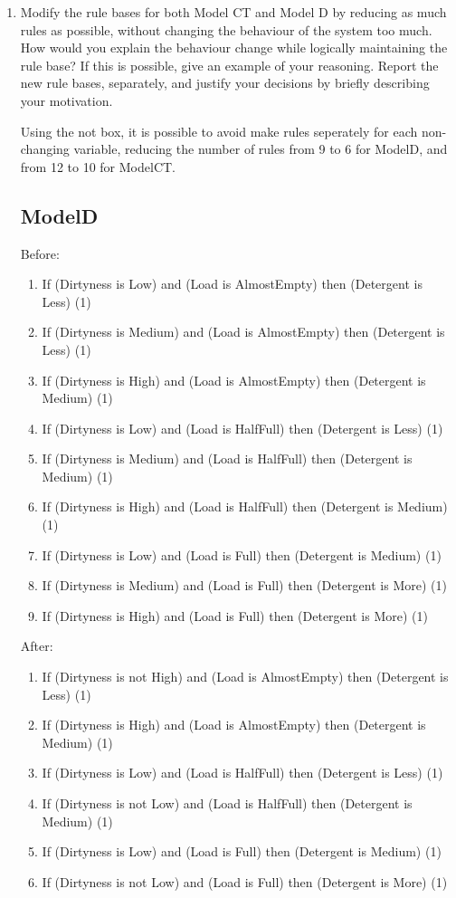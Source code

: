\documentclass[11pt]{article}
\begin{document}
\begin{enumerate}[label=(\alph*)]
  \item Modify the rule bases for both Model CT and Model D by reducing as much
  rules as possible, without changing the behaviour of the system too much. How
  would you explain the behaviour change while logically maintaining the rule
  base? If this is possible, give an example of your reasoning. Report the new
  rule bases, separately, and justify your decisions by brieﬂy describing your
  motivation.

  Using the not box, it is possible to avoid make rules seperately for each
  non-changing variable, reducing the number of rules from 9 to 6 for ModelD, and from 12 to 10 for ModelCT.

  \subsection*{ModelD}

  Before:
  \begin{enumerate}[label=(\arabic*)]
  \item If (Dirtyness is Low) and (Load is AlmostEmpty) then (Detergent is Less) (1)
  \item If (Dirtyness is Medium) and (Load is AlmostEmpty) then (Detergent is Less) (1)
  \item If (Dirtyness is High) and (Load is AlmostEmpty) then (Detergent is Medium) (1)
  \item If (Dirtyness is Low) and (Load is HalfFull) then (Detergent is Less) (1)
  \item If (Dirtyness is Medium) and (Load is HalfFull) then (Detergent is Medium) (1)
  \item If (Dirtyness is High) and (Load is HalfFull) then (Detergent is Medium) (1)
  \item If (Dirtyness is Low) and (Load is Full) then (Detergent is Medium) (1)
  \item If (Dirtyness is Medium) and (Load is Full) then (Detergent is More) (1)
  \item If (Dirtyness is High) and (Load is Full) then (Detergent is More) (1)
  \end{enumerate}

  After:
  \begin{enumerate}[label=(\arabic*)]
  \item If (Dirtyness is not High) and (Load is AlmostEmpty) then (Detergent is Less) (1)
  \item If (Dirtyness is High) and (Load is AlmostEmpty) then (Detergent is Medium) (1)
  \item If (Dirtyness is Low) and (Load is HalfFull) then (Detergent is Less) (1)\item If (Dirtyness is not Low) and (Load is HalfFull) then (Detergent is Medium) (1)
  \item If (Dirtyness is Low) and (Load is Full) then (Detergent is Medium) (1)
  \item If (Dirtyness is not Low) and (Load is Full) then (Detergent is More) (1)
  \end{enumerate}


\end{enumerate}
\end{document}

